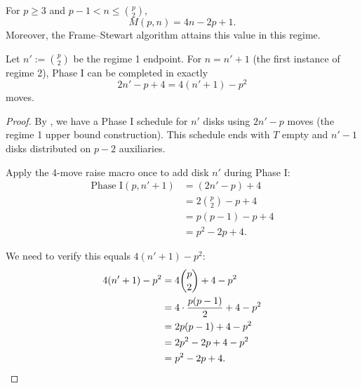 \documentclass[10pt,a4paper]{amsart}
\begin{document}
\begin{theorem}\label{thm:regime1}
For $p \geq 3$ and $p-1 < n \leq \binom{p}{2}$,
\[
M(p,n) = 4n - 2p + 1.
\]
Moreover, the Frame--Stewart algorithm attains this value in this regime.
\end{theorem}

\begin{lemma}\label{lem:regime2-base}
Let $n' := \binom{p}{2}$ be the regime 1 endpoint. For $n = n' + 1$ (the first instance of regime 2), Phase I can be completed in exactly
\[
2n' - p + 4 = 4(n'+1) - p^2
\]
moves.
\end{lemma}

\begin{proof}
By , we have a Phase I schedule for $n'$ disks using $2n' - p$ moves (the regime 1 upper bound construction). This schedule ends with $T$ empty and $n'-1$ disks distributed on $p-2$ auxiliaries.

Apply the 4-move raise macro once to add disk $n'$ during Phase I:
\begin{align*}
\text{Phase I}(p, n'+1) &= (2n' - p) + 4 \\
&= 2\binom{p}{2} - p + 4 \\
&= p(p-1) - p + 4 \\
&= p^2 - 2p + 4.
\end{align*}

We need to verify this equals $4(n'+1) - p^2$:
\begin{align*}
4(n'+1) - p^2 &= 4\binom{p}{2} + 4 - p^2 \\
&= 4 \cdot \frac{p(p-1)}{2} + 4 - p^2 \\
&= 2p(p-1) + 4 - p^2 \\
&= 2p^2 - 2p + 4 - p^2 \\
&= p^2 - 2p + 4. \qedhere
\end{align*}
\end{proof}
\end{document}
